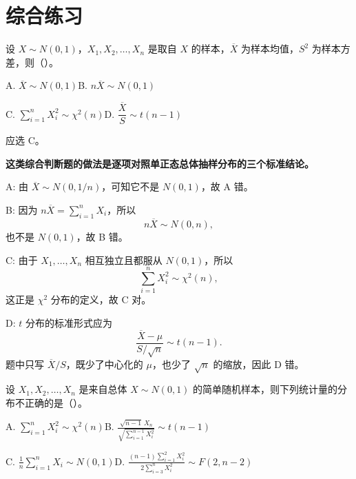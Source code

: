 ﻿\documentclass[lang=cn,11pt]{elegantbook}
\begin{document}
\section{综合练习}

\begin{exercise}\label{exer:6-multi-normal}
设 \(X \sim N(0,1)\)，\(X_1, X_2, \dots, X_n\) 是取自 \(X\) 的样本，\(\overline{X}\) 为样本均值，\(S^2\) 为样本方差，则（\quad）。\par
A. \(\overline{X} \sim N(0,1)\)\qquad B. \(n\overline{X} \sim N(0,1)\)\par
C. \(\displaystyle\sum_{i=1}^{n}X_i^2 \sim \chi^2(n)\)\qquad D. \(\dfrac{\overline{X}}{S} \sim t(n-1)\)
\end{exercise}

\begin{solution}
应选 C。

\textbf{这类综合判断题的做法是逐项对照单正态总体抽样分布的三个标准结论。}

A: 由 \(\overline{X}\sim N(0,1/n)\)，可知它不是 \(N(0,1)\)，故 A 错。

B: 因为 \(n\overline{X}=\sum_{i=1}^n X_i\)，所以
\[
n\overline{X}\sim N(0,n),
\]
也不是 \(N(0,1)\)，故 B 错。

C: 由于 \(X_1,\dots,X_n\) 相互独立且都服从 \(N(0,1)\)，所以
\[
\sum_{i=1}^n X_i^2\sim \chi^2(n),
\]
这正是 \(\chi^2\) 分布的定义，故 C 对。

D: \(t\) 分布的标准形式应为
\[
\frac{\overline{X}-\mu}{S/\sqrt{n}}\sim t(n-1).
\]
题中只写 \(\overline{X}/S\)，既少了中心化的 \(\mu\)，也少了 \(\sqrt{n}\) 的缩放，因此 D 错。
\end{solution}

\begin{exercise}\label{exer:6-multi-harbin}
设 \(X_1, X_2, \dots, X_n\) 是来自总体 \(X \sim N(0,1)\) 的简单随机样本，则下列统计量的分布不正确的是（\quad）。\par
A. \(\displaystyle\sum_{i=1}^{n}X_i^2 \sim \chi^2(n)\)\qquad B. \(\displaystyle\frac{\sqrt{n-1}\,X_n}{\sqrt{\sum_{i=1}^{n-1}X_i^2}} \sim t(n-1)\)\par
C. \(\displaystyle\frac{1}{n}\sum_{i=1}^{n}X_i \sim N(0,1)\)\qquad D. \(\displaystyle\frac{(n-1)\sum_{i=1}^{2}X_i^2}{2\sum_{i=3}^{n}X_i^2} \sim F(2,n-2)\)
\end{exercise}
\end{document}
